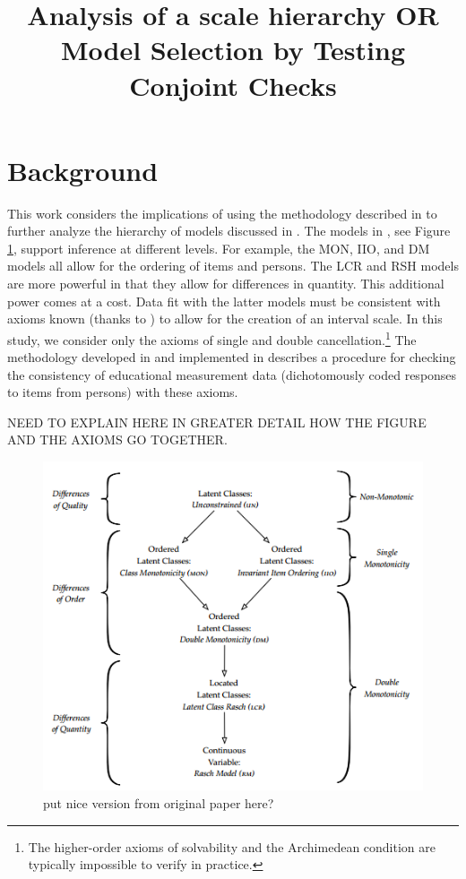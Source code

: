\documentclass[12pt]{article}
\title{Analysis of a scale hierarchy OR Model Selection by Testing Conjoint Checks}
\date{}
\begin{document}
\maketitle
\onehalfspacing
\section{Background}
This work considers the implications of using the methodology described in  to further analyze the hierarchy of models discussed in . The models in , see Figure \ref{orig}, support inference at different levels. For example, the MON, IIO, and DM models all allow for the ordering of items and persons. The LCR and RSH models are more powerful in that they allow for differences in quantity. This additional power comes at a cost. Data fit with the latter models must be consistent with axioms known (thanks to ) to allow for the creation of an interval scale. In this study, we consider only the axioms of single and double cancellation.\footnote{The higher-order axioms of solvability and the Archimedean condition are typically impossible to verify in practice.} The methodology developed in  and implemented in  describes a procedure for checking the consistency of educational measurement data (dichotomously coded responses to items from persons) with these axioms. 

NEED TO EXPLAIN HERE IN GREATER DETAIL HOW THE FIGURE AND THE AXIOMS GO TOGETHER.
\begin{figure}
\centering
\caption{put nice version from original paper here?} \label{orig}
\includegraphics[width=\textwidth]{./figs/hierarchy}
\end{figure}
\end{document}
